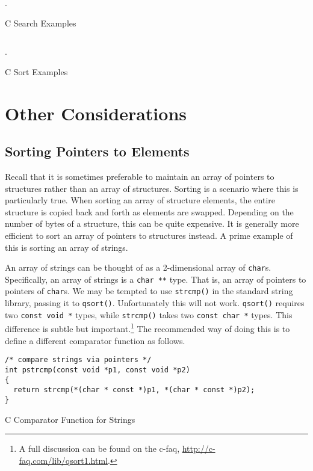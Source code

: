 \begin{listing}[!h]
\inputminted[fontsize=\scriptsize]{c}{code/searchDemo.c}.
\caption{C Search Examples}
\label{code:c:searchExamples}
\end{listing}

\begin{listing}[!h]
\inputminted[]{c}{code/sortDemo.c}.
\caption{C Sort Examples}
\label{code:c:sortExamples}
\end{listing}

\section{Other Considerations}

\subsection{Sorting Pointers to Elements}

Recall that it is sometimes preferable to maintain an array of pointers
to structures rather than an array of structures.  Sorting is a scenario
where this is particularly true.  When sorting an array of structure
elements, the entire structure is copied back and forth as elements
are swapped.  Depending on the number of bytes of a structure, this can
be quite expensive.  It is generally more efficient to sort an array of 
pointers to structures instead.  A prime example of this is sorting an
array of strings.

An array of strings can be thought of as a 2-dimensional array of 
\texttt{char}s.  Specifically, an array of strings is a 
\texttt{char **} type.  That is, an array of pointers to 
pointers of \texttt{char}s.  We may be tempted to use 
\texttt{strcmp()} in the standard string library, passing it 
to \texttt{qsort()}.  
Unfortunately this will not work.  \texttt{qsort()} requires 
two \texttt{const void *} types, while \texttt{strcmp()} 
takes two \texttt{const char *} types.  This difference is 
subtle but important.\footnote{A full discussion can be found on the 
c-faq, \url{http://c-faq.com/lib/qsort1.html}.}  The recommended way 
of doing this is to define a different comparator function as follows.

\begin{listing}[!h]
\begin{verbatim}
/* compare strings via pointers */
int pstrcmp(const void *p1, const void *p2)
{
  return strcmp(*(char * const *)p1, *(char * const *)p2);
}
\end{verbatim}
\caption{C Comparator Function for Strings}
\end{listing}

